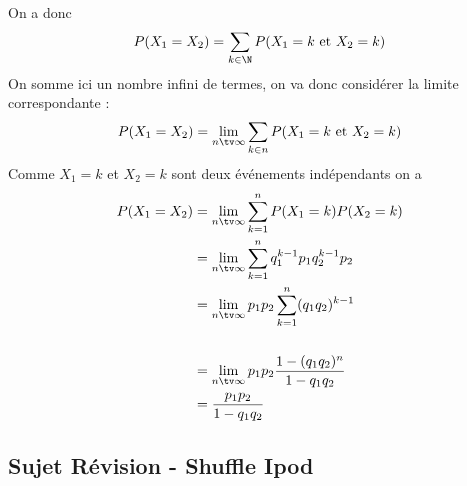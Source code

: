 \begin{correction}
\begin{enumerate}
On a donc 
$$P(X_1= X_2) = \sum_{k\in \N} P (X_1 = k \text{ et } X_2 = k)$$
On somme ici un nombre infini de termes, on va donc considérer la limite correspondante : 
$$P(X_1= X_2)  = \lim_{n\tv \infty}  \sum_{k\in n} P (X_1 = k \text{ et } X_2 = k)$$
Comme $X_1= k $ et $X_2=k$ sont deux événements indépendants on a 
\begin{align*}
P(X_1= X_2) & = \lim_{n\tv \infty}  \sum_{k= 1}^n P (X_1 = k ) P(X_2 = k)\\
					&= \lim_{n\tv \infty}  \sum_{k= 1}^nq_1^{k-1} p_1 q_2^{k-1} p_2\\
					&= \lim_{n\tv \infty}  p_1p_2\sum_{k= 1}^n (q_1q_2)^{k-1} \\\\
					&= \lim_{n\tv \infty}  p_1p_2\frac{1-(q_1q_2)^n}{1-q_1q_2} \\					
					&= \frac{p_1p_2}{1-q_1q_2} 
\end{align*}


\end{enumerate}


\end{correction}




\subsection{Sujet Révision - Shuffle Ipod}


